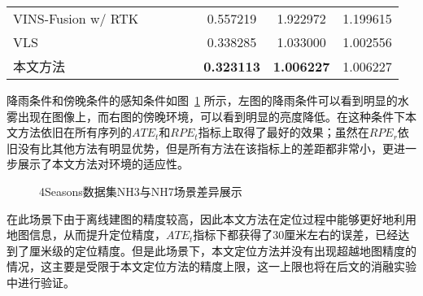 \begin{table}
\begin{tabular}{lccccccc}
VINS-Fusion w/ RTK &                                                                                &                     &                     &                     & 0.557219          & 1.922972          & 1.199615          \\
VLS                &                                                                                &                     &                     &                     & 0.338285          & 1.033000          & 1.002556          \\
本文方法               &                                                                                &                     &                     &                     & \cellcolor[HTML]{FFCCC9}\textbf{0.323113} & \cellcolor[HTML]{FFCCC9}\textbf{1.006227} & 1.006227          \\ \bottomrule
\end{tabular}
\label{tab:loc_4seasons_nh23}
\end{table}

降雨条件和傍晚条件的感知条件如图~\ref{fig:scene_nh} 所示，左图的降雨条件可以看到明显的水雾出现在图像上，而右图的傍晚环境，可以看到明显的亮度降低。在这种条件下本文方法依旧在所有序列的$ATE_t$和$RPE_t$指标上取得了最好的效果；虽然在$RPE_r$依旧没有比其他方法有明显优势，但是所有方法在该指标上的差距都非常小，更进一步展示了本文方法对环境的适应性。

\begin{figure}
  \centering
  \caption{4Seasons数据集NH3与NH7场景差异展示}
  \label{fig:scene_nh}
\end{figure}

在此场景下由于离线建图的精度较高，因此本文方法在定位过程中能够更好地利用地图信息，从而提升定位精度，$ATE_t$指标下都获得了30厘米左右的误差，已经达到了厘米级的定位精度。但是此场景下，本文定位方法并没有出现超越地图精度的情况，这主要是受限于本文定位方法的精度上限，这一上限也将在后文的消融实验中进行验证。

